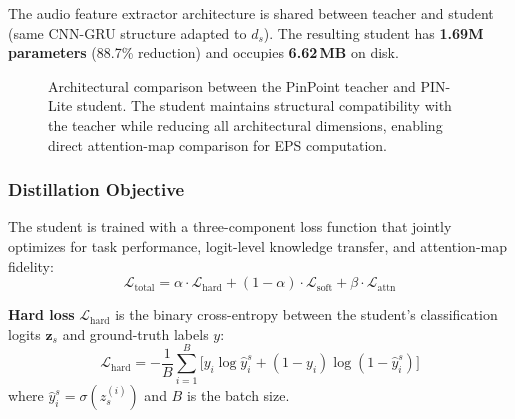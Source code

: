 \documentclass[lettersize,journal]{IEEEtran}
\begin{document}
The audio feature extractor architecture is shared between teacher and student (same CNN-GRU structure adapted to $d_s$). The resulting student has \textbf{1.69M parameters} (88.7\% reduction) and occupies \textbf{6.62\,MB} on disk.

\begin{figure}[!t]
\centering
{}
\caption{Architectural comparison between the PinPoint teacher and PIN-Lite student. The student maintains structural compatibility with the teacher while reducing all architectural dimensions, enabling direct attention-map comparison for EPS computation.}
\label{fig:architecture}
\end{figure}

\subsubsection{Distillation Objective}
The student is trained with a three-component loss function that jointly optimizes for task performance, logit-level knowledge transfer, and attention-map fidelity:
\begin{equation}
\label{eq:loss_total}
    \mathcal{L}_{\text{total}} = \alpha \cdot \mathcal{L}_{\text{hard}} + (1 - \alpha) \cdot \mathcal{L}_{\text{soft}} + \beta \cdot \mathcal{L}_{\text{attn}}
\end{equation}

\textbf{Hard loss} $\mathcal{L}_{\text{hard}}$ is the binary cross-entropy between the student's classification logits $\mathbf{z}_s$ and ground-truth labels $y$:
\begin{equation}
    \mathcal{L}_{\text{hard}} = -\frac{1}{B}\sum_{i=1}^{B}\bigl[y_i \log \hat{y}_i^s + (1 - y_i)\log(1 - \hat{y}_i^s)\bigr]
\end{equation}
where $\hat{y}_i^s = \sigma(z_s^{(i)})$ and $B$ is the batch size.
\end{document}
